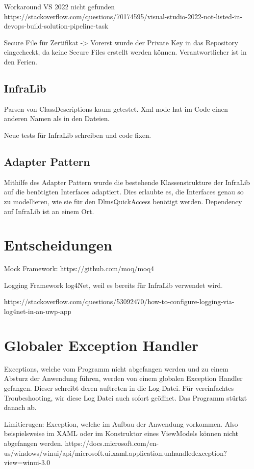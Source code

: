 Workaround VS 2022 nicht gefunden
https://stackoverflow.com/questions/70174595/visual-studio-2022-not-listed-in-devops-build-solution-pipeline-task

Secure File für Zertifikat
-> Vorerst wurde der Private Key in das Repository eingecheckt, da keine Secure Files erstellt werden können. Verantwortlicher ist in den Ferien.


\subsection{InfraLib}
Parsen von ClassDescriptions kaum getestet. Xml node hat im Code einen anderen Namen als in den Dateien.

Neue tests für InfraLib schreiben und code fixen.

\subsection{Adapter Pattern}

Mithilfe des Adapter Pattern wurde die bestehende Klassenstrukture der InfraLib auf die benötigten Interfaces adaptiert.
Dies erlaubte es, die Interfaces genau so zu modellieren, wie sie für den DlmsQuickAccess benötigt werden.
Dependency auf InfraLib ist an einem Ort.


\section{Entscheidungen}

Mock Framework:
https://github.com/moq/moq4


Logging Framework
log4Net, weil es bereits für InfraLib verwendet wird. 

https://stackoverflow.com/questions/53092470/how-to-configure-logging-via-log4net-in-an-uwp-app

\section{Globaler Exception Handler}

Exceptions, welche vom Programm nicht abgefangen werden und zu einem Absturz der Anwendung führen, werden von einem globalen Exception Handler gefangen.
Dieser schreibt deren auftreten in die Log-Datei. Für vereinfachtes Troubeshooting, wir diese Log Datei auch sofort geöffnet. Das Programm stürtzt danach ab.

Limitierugen:
Exception, welche im Aufbau der Anwendung vorkommen. Also beispielsweise im XAML oder im Konstruktor eines ViewModels können nicht abgefangen werden.
https://docs.microsoft.com/en-us/windows/winui/api/microsoft.ui.xaml.application.unhandledexception?view=winui-3.0


